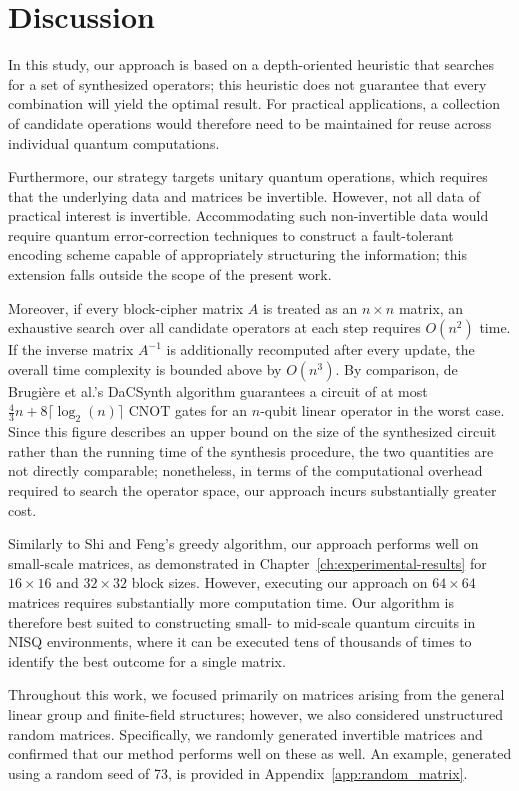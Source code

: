 \chapter{Discussion}
\label{ch:discussion}

In this study, our approach is based on a depth-oriented heuristic that searches for a set of synthesized operators; this heuristic does not guarantee that every combination will yield the optimal result. For practical applications, a collection of candidate operations would therefore need to be maintained for reuse across individual quantum computations.

Furthermore, our strategy targets unitary quantum operations, which requires that the underlying data and matrices be invertible. However, not all data of practical interest is invertible. Accommodating such non-invertible data would require quantum error-correction techniques to construct a fault-tolerant encoding scheme capable of appropriately structuring the information; this extension falls outside the scope of the present work.

Moreover, if every block-cipher matrix $A$ is treated as an $n \times n$ matrix, an exhaustive search over all candidate operators at each step requires $O(n^{2})$ time. If the inverse matrix $A^{-1}$ is additionally recomputed after every update, the overall time complexity is bounded above by $O(n^{3})$. By comparison, de Brugière et al.'s DaCSynth algorithm guarantees a circuit of at most $\frac{4}{3}n + 8\lceil \log_2(n) \rceil$ CNOT gates for an $n$-qubit linear operator in the worst case. Since this figure describes an upper bound on the size of the synthesized circuit rather than the running time of the synthesis procedure, the two quantities are not directly comparable; nonetheless, in terms of the computational overhead required to search the operator space, our approach incurs substantially greater cost.

Similarly to Shi and Feng's greedy algorithm, our approach performs well on small-scale matrices, as demonstrated in Chapter~\ref{ch:experimental-results} for $16 \times 16$ and $32 \times 32$ block sizes. However, executing our approach on $64 \times 64$ matrices requires substantially more computation time. Our algorithm is therefore best suited to constructing small- to mid-scale quantum circuits in NISQ environments, where it can be executed tens of thousands of times to identify the best outcome for a single matrix.

Throughout this work, we focused primarily on matrices arising from the general linear group and finite-field structures; however, we also considered unstructured random matrices. Specifically, we randomly generated invertible matrices and confirmed that our method performs well on these as well. An example, generated using a random seed of 73, is provided in Appendix~\ref{app:random_matrix}.

